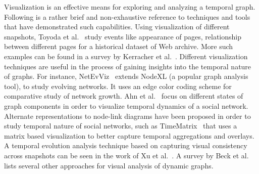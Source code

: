\documentclass{svjour3}
\begin{document}
Visualization is an effective means for exploring and analyzing a temporal graph. Following is a rather brief and non-exhaustive reference to techniques and tools that have demonstrated such capabilities. 
Using visualization of different snapshots, Toyoda et al.~\cite{toyoda2005system} study events like appearance of pages, relationship between different pages for a historical dataset of Web archive.
More such examples can be found in a survey by Kerracher et al.~\cite{kerracher2015task}. Different visualization techniques are useful in the process of gaining insights into the temporal nature of graphs. For instance, NetEvViz~\cite{khurana2011visual} extends NodeXL (a popular graph analysis tool), to study evolving networks. It uses an edge color coding scheme for comparative study of network growth. Ahn et al.~\cite{ahn2011temporal} focus on different states of graph components in order to visualize temporal dynamics of a social network.
Alternate representations to node-link diagrams have been proposed in order to study temporal nature of social networks, such as TimeMatrix~\cite{yi2010timematrix} that uses a matrix based visualization to better capture temporal aggregations and overlays. A temporal evolution analysis technique based on capturing visual consistency across snapshots can be seen in the work of Xu et al.~\cite{xu2011visualizing}.
A survey by Beck et al.~\cite{beck2014state} lists several other approaches for visual analysis of dynamic graphs. 





\end{document}
